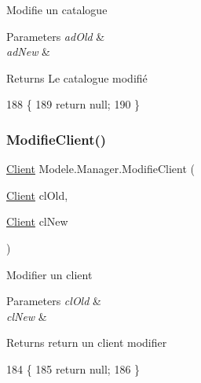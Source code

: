 Modifie un catalogue 


\begin{DoxyParams}{Parameters}
{\em ad\+Old} & \\
\hline
{\em ad\+New} & \\
\hline
\end{DoxyParams}
\begin{DoxyReturn}{Returns}
Le catalogue modifié
\end{DoxyReturn}

\begin{DoxyCode}
188         \{
189             \textcolor{keywordflow}{return} null;
190         \}
\end{DoxyCode}
\mbox{\label{classModele_1_1Manager_a77509aff7cf7e4ada30cb64a2389f53b}} 
\subsubsection{\texorpdfstring{Modifie\+Client()}{ModifieClient()}}
{\footnotesize\ttfamily \hyperlink{classModele_1_1Client}{Client} Modele.\+Manager.\+Modifie\+Client (\begin{DoxyParamCaption}\item[{\hyperlink{classModele_1_1Client}{Client}}]{cl\+Old,  }\item[{\hyperlink{classModele_1_1Client}{Client}}]{cl\+New }\end{DoxyParamCaption})\hspace{0.3cm}{\ttfamily [inline]}}



Modifier un client 


\begin{DoxyParams}{Parameters}
{\em cl\+Old} & \\
\hline
{\em cl\+New} & \\
\hline
\end{DoxyParams}
\begin{DoxyReturn}{Returns}
return un client modifier
\end{DoxyReturn}

\begin{DoxyCode}
184         \{
185             \textcolor{keywordflow}{return} null;
186         \}
\end{DoxyCode}
\mbox{\label{classModele_1_1Manager_a4baa269969e367de8472b7521ab3fa93}} 
